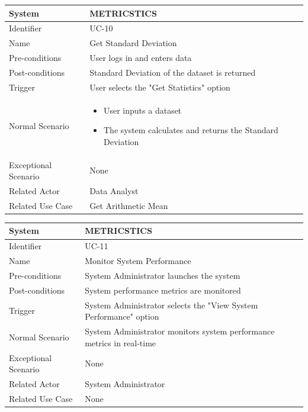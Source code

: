 \documentclass[letterpaper,12pt]{article}
\begin{document}
\begin{itemize}
\begin{tabular}{|p{1.45in}|p{3.65in}|}
    \hline
    System & METRICSTICS \\
    \hline
    Identifier & UC-10 \\
    \hline
    Name &  Get Standard Deviation \\
    \hline
    Pre-conditions & User logs in and enters data\\
   \hline
    Post-conditions & Standard Deviation of the dataset is returned\\
   \hline
    Trigger & User selects the "Get Statistics" option \\
    \hline
    Normal Scenario &  \begin{itemize}
   \item User inputs a dataset
   \item The system calculates and returns the Standard Deviation
   \end{itemize}\\
    \hline
    Exceptional Scenario & None \\
    \hline
    Related Actor& Data Analyst\\
    \hline
    Related Use Case & Get Arithmetic Mean \\
\hline
\end{tabular}
\bigskip
\bigskip

\begin{tabular}{|p{1.45in}|p{3.65in}|}
    \hline
    System & METRICSTICS \\
    \hline
    Identifier & UC-11 \\
    \hline
    Name &  Monitor System Performance \\
    \hline
    Pre-conditions & System Administrator launches the system\\
   \hline
    Post-conditions & System performance metrics are monitored\\
   \hline
    Trigger &  System Administrator selects the "View System Performance" option \\
    \hline
    Normal Scenario & System Administrator monitors system performance metrics in real-time \\
    \hline
    Exceptional Scenario & None \\
    \hline
    Related Actor& System Administrator\\
    \hline
    Related Use Case & None \\
\hline
\end{tabular}
\bigskip
\bigskip


\end{itemize}
\end{document}
